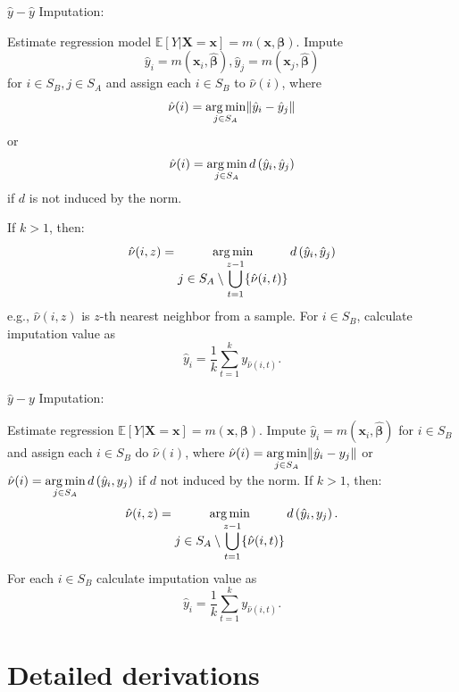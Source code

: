 \documentclass[
]{jss}
\begin{document}
\begin{algorithm}[ht!]
\caption{$\hat{y}-\hat{y}$ Imputation:}
\label{algo-3}
\begin{algorithmic}[1]
\State Estimate regression model $\mathbb{E}[Y|\boldsymbol{X}=\boldsymbol{x}]=m(\boldsymbol{x}, \boldsymbol{\beta})$.\;
\State Impute $$\hat{y}_{i}=m\left(\boldsymbol{x}_{i},\hat{\boldsymbol{\beta}}\right), 
\hat{y}_{j}=m\left(\boldsymbol{x}_{j},\hat{\boldsymbol{\beta}}\right)$$
for $i\in S_{B}, j\in S_{A}$ and assign each 
$i\in S_{B}$ to $\hat{\nu}(i)$, where
$$\displaystyle \hat{\nu}(i)=
\operatornamewithlimits{arg\,min}_{j\in S_{A}}\lVert \hat{y}_{i}-\hat{y}_{j}\rVert$$ or
$$\displaystyle \hat{\nu}(i)=
\operatornamewithlimits{arg\,min}_{j\in S_{A}}d\left(\hat{y}_{i},\hat{y}_{j}\right)$$ if $d$ is not induced by the norm.\;

\State If $k>1$, then:
$$\hat{\nu}(i, z) = \operatornamewithlimits{arg\,min}_{\displaystyle j\in S_{A}\setminus\bigcup_{t=1}^{z-1}
\{\hat{\nu}(i, t)\}} d\left(\hat{y}_{i},\hat{y}_{j}\right)$$
e.g., $\hat{\nu}(i, z)$ is $z$-th nearest neighbor from a sample.\;
\State For $i \in S_B$, calculate imputation value as 
$$
\hat{y}_i = \frac{1}{k}\sum_{t=1}^{k}y_{\hat{\nu}(i, t)}.
$$
\end{algorithmic}
\end{algorithm}

\begin{algorithm}[ht!]
\caption{$\hat{y}-y$ Imputation:}
\label{algo-4}
\begin{algorithmic}[1]
\State Estimate regression $\mathbb{E}[Y|\boldsymbol{X}=\boldsymbol{x}]=m(\boldsymbol{x}, \boldsymbol{\beta})$.\;
\State Impute $\hat{y}_{i}=m\left(\boldsymbol{x}_{i},\hat{\boldsymbol{\beta}}\right)$ 
for $i \in S_{B}$ and assign each 
$i \in S_{B}$ do $\hat{\nu}(i)$, where
$\displaystyle \hat{\nu}(i)=
\operatornamewithlimits{arg\,min}_{j \in S_{A}}\lVert \hat{y}_{i}-y_{j}\rVert$ or
$\displaystyle \hat{\nu}(i)=
\operatornamewithlimits{arg\,min}_{j \in S_{A}}d\left(\hat{y}_{i},y_{j}\right)$ 
if $d$ not induced by the norm.\;
\State If $k>1$, then:
$$\hat{\nu}(i, z) = \operatornamewithlimits{arg\,min}_{\displaystyle j \in S_{A} \setminus \bigcup_{t=1}^{z-1}
\{\hat{\nu}(i, t)\}}
d\left(\hat{y}_{i},y_{j}\right).$$
\State For each $i \in S_B$ calculate imputation value as
$$
\hat{y}_i = \frac{1}{k}\sum_{t=1}^{k}y_{\hat{\nu}(i, t)}.
$$
\end{algorithmic}
\end{algorithm}

\section{Detailed derivations}\label{sec-derivations}
\end{document}
